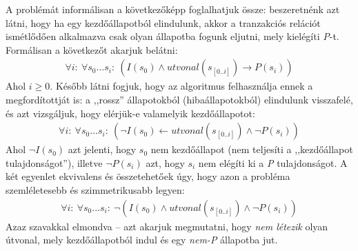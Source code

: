 A problémát informálisan a következőképp foglalhatjuk össze: beszeretnénk azt látni, hogy ha egy kezdőállapotból elindulunk, akkor a tranzakciós relációt ismétlődően alkalmazva csak olyan állapotba fogunk eljutni, mely kielégíti \emph{P}-t. Formálisan a következőt akarjuk belátni:
\begin{align}
	\forall i:~\forall s_{0} \dots s_{i}:~(I(s_{0}) \wedge utvonal(s_{[0..i]}) \rightarrow P(s_{i}))
\end{align}
Ahol $i \geq 0$. Később látni fogjuk, hogy az algoritmus felhasználja ennek a megfordítottját is: a ,,rossz'' állapotokból (hibaállapotokból) elindulunk visszafelé, és azt vizsgáljuk, hogy elérjük-e valamelyik kezdőállapotot:
\begin{align}
	\forall i:~\forall s_{0} \dots s_{i}:~(\neg I(s_{0}) \leftarrow utvonal(s_{[0..i]}) \wedge \neg P(s_{i}))
\end{align}
Ahol $\neg I(s_{0})$ azt jelenti, hogy $s_{0}$ nem kezdőállapot (nem teljesíti a ,,kezdőállapot tulajdonságot''), illetve $\neg P(s_{i})$ azt, hogy $s_{i}$ nem elégíti ki a \emph{P} tulajdonságot. A két egyenlet ekvivalens és összetehetőek úgy, hogy azon a probléma szemléletesebb és szimmetrikusabb legyen:
\begin{align}
	\forall i:~\forall s_{0} \dots s_{i}:~\neg(I(s_{0}) \wedge utvonal(s_{[0..i]}) \wedge \neg P(s_{i}))
\end{align}
Azaz szavakkal elmondva -- azt akarjuk megmutatni, hogy \emph{nem létezik} olyan útvonal, mely kezdőállapotból indul és egy \emph{nem-P} állapotba jut.